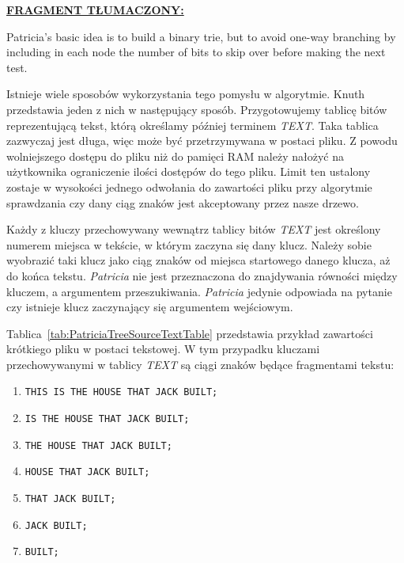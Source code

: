 	\ifsourcematerial
	\begin{displayquote}
		\color{ao(english)}
		\underline{\textbf{FRAGMENT TŁUMACZONY:}} \newline 
		
		Patricia’s basic idea is to build a binary trie, but to avoid one-way branching
		by including in each node the number of bits to skip over before making the next
		test. 
	\end{displayquote}
	\fi
	
	Istnieje wiele sposobów wykorzystania tego pomysłu w algorytmie. Knuth przedstawia jeden z nich w następujący sposób. Przygotowujemy tablicę bitów reprezentującą tekst, którą określamy później terminem \emph{TEXT}. Taka tablica zazwyczaj jest długa, więc może być przetrzymywana w postaci pliku. Z powodu wolniejszego dostępu do pliku niż do pamięci RAM należy nałożyć na użytkownika ograniczenie ilości dostępów do tego pliku. Limit ten ustalony zostaje w wysokości jednego odwołania do zawartości pliku przy algorytmie sprawdzania czy dany ciąg znaków jest akceptowany przez nasze drzewo. \newpage
	
	Każdy z kluczy przechowywany wewnątrz tablicy bitów \emph{TEXT} jest określony numerem miejsca w tekście, w którym zaczyna się dany klucz. Należy sobie wyobrazić taki klucz jako ciąg znaków od miejsca startowego danego klucza, aż do końca tekstu. \emph{Patricia} nie jest przeznaczona do znajdywania równości między kluczem, a argumentem przeszukiwania. \emph{Patricia} jedynie odpowiada na pytanie czy istnieje klucz zaczynający się argumentem wejściowym.
	
	Tablica~\ref{tab:PatriciaTreeSourceTextTable} przedstawia przykład zawartości krótkiego pliku w postaci tekstowej. W tym przypadku kluczami przechowywanymi w tablicy \emph{TEXT} są ciągi znaków będące fragmentami tekstu:
	\begin{enumerate}
		\item \texttt{THIS IS THE HOUSE THAT JACK BUILT;}
		\item \texttt{IS THE HOUSE THAT JACK BUILT;}
		\item \texttt{THE HOUSE THAT JACK BUILT;}
		\item \texttt{HOUSE THAT JACK BUILT;}
		\item \texttt{THAT JACK BUILT;}
		\item \texttt{JACK BUILT;}
		\item \texttt{BUILT;}
	\end{enumerate}

